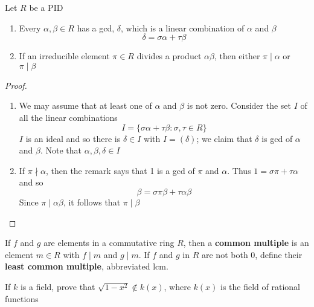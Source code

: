 \documentclass[11pt]{article}
\begin{document}
\begin{theorem}[]
\label{thm3.57}
Let \(R\) be a PID
\begin{enumerate}
\item Every \(\alpha,\beta\in R\) has a gcd, \(\delta\), which is a linear combination of
\(\alpha\) and \(\beta\)
\begin{equation*}
\delta=\sigma\alpha+\tau\beta
\end{equation*}
\item If an irreducible element \(\pi\in R\) divides a product \(\alpha\beta\), then
either \(\pi\mid\alpha\) or \(\pi\mid\beta\)
\end{enumerate}
\end{theorem}
\begin{proof}
\begin{enumerate}
\item We may assume that at least one of \(\alpha\) and \(\beta\) is not zero. Consider the set \(I\)
of all the linear combinations
\begin{equation*}
I=\{\sigma\alpha+\tau\beta:\sigma,\tau\in R\}
\end{equation*}
\(I\) is an ideal and so there is \(\delta\in I\) with \(I=(\delta)\); we claim
that \(\delta\) is gcd of \(\alpha\) and \(\beta\). Note that \(\alpha,\beta,\delta \in I\)
\item If \(\pi\nmid\alpha\), then the remark says that 1 is a gcd of \(\pi\) and \(\alpha\).
Thus \(1=\sigma\pi+\tau\alpha\) and so
\begin{equation*}
\beta=\sigma\pi\beta+\tau\alpha\beta
\end{equation*}
Since \(\pi\mid\alpha\beta\), it follows that \(\pi\mid\beta\)
\end{enumerate}
\end{proof}

\begin{definition}[]
If \(f\) and \(g\) are elements in a commutative ring \(R\), then a \textbf{common multiple}
is an element \(m\in R\) with \(f\mid m\) and \(g\mid m\). If \(f\) and \(g\) in
\(R\) are not both 0, define their \textbf{least common multiple}, abbreviated lcm.
\end{definition}

\begin{exercise}
\label{ex3.34}
If \(k\) is a field, prove that \(\sqrt{1-x^2}\not\in k(x)\), where \(k(x)\) is
the field of rational functions
\end{exercise}
\end{document}
